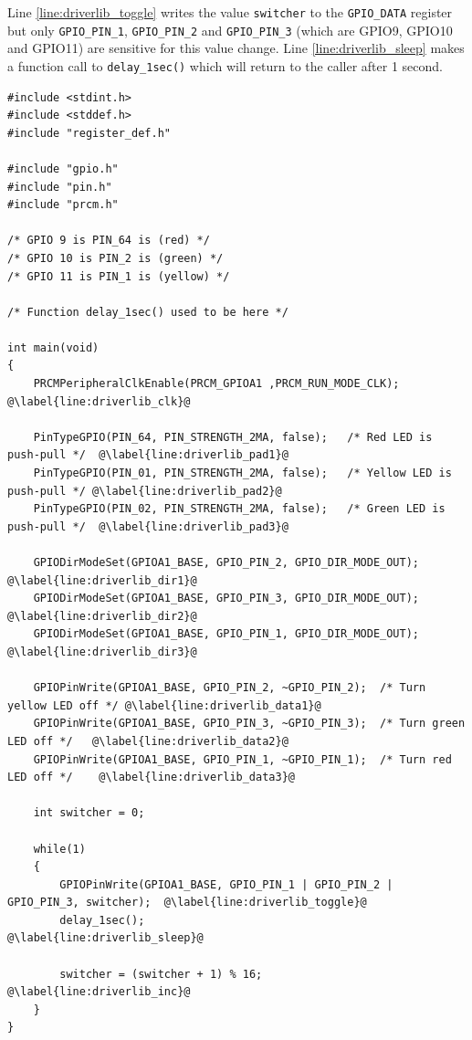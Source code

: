 Line \ref{line:driverlib_toggle} writes the value \texttt{switcher} to the \texttt{GPIO\_DATA} register but only \texttt{GPIO\_PIN\_1}, \texttt{GPIO\_PIN\_2} and \texttt{GPIO\_PIN\_3} (which are GPIO9, GPIO10 and GPIO11) are sensitive for this value change. 
Line \ref{line:driverlib_sleep} makes a function call to \texttt{delay\_1sec()} which will return to the caller after 1 second.

\begin{lstlisting}[style=CStyle, caption={Toggling LEDs according to Table \ref{tab:led_scheme} using Driverlib library}, captionpos=b, label={lst:led_driverlib}, escapechar=@]
#include <stdint.h>
#include <stddef.h>
#include "register_def.h"
 
#include "gpio.h"
#include "pin.h"
#include "prcm.h"
 
/* GPIO 9 is PIN_64 is (red) */
/* GPIO 10 is PIN_2 is (green) */
/* GPIO 11 is PIN_1 is (yellow) */
 
/* Function delay_1sec() used to be here */
 
int main(void)
{
    PRCMPeripheralClkEnable(PRCM_GPIOA1 ,PRCM_RUN_MODE_CLK);        @\label{line:driverlib_clk}@
 
    PinTypeGPIO(PIN_64, PIN_STRENGTH_2MA, false);   /* Red LED is push-pull */  @\label{line:driverlib_pad1}@
    PinTypeGPIO(PIN_01, PIN_STRENGTH_2MA, false);   /* Yellow LED is push-pull */ @\label{line:driverlib_pad2}@
    PinTypeGPIO(PIN_02, PIN_STRENGTH_2MA, false);   /* Green LED is push-pull */  @\label{line:driverlib_pad3}@
 
    GPIODirModeSet(GPIOA1_BASE, GPIO_PIN_2, GPIO_DIR_MODE_OUT); @\label{line:driverlib_dir1}@
    GPIODirModeSet(GPIOA1_BASE, GPIO_PIN_3, GPIO_DIR_MODE_OUT); @\label{line:driverlib_dir2}@
    GPIODirModeSet(GPIOA1_BASE, GPIO_PIN_1, GPIO_DIR_MODE_OUT); @\label{line:driverlib_dir3}@
 
    GPIOPinWrite(GPIOA1_BASE, GPIO_PIN_2, ~GPIO_PIN_2);  /* Turn yellow LED off */ @\label{line:driverlib_data1}@
    GPIOPinWrite(GPIOA1_BASE, GPIO_PIN_3, ~GPIO_PIN_3);  /* Turn green LED off */   @\label{line:driverlib_data2}@
    GPIOPinWrite(GPIOA1_BASE, GPIO_PIN_1, ~GPIO_PIN_1);  /* Turn red LED off */    @\label{line:driverlib_data3}@
 
    int switcher = 0;
 
    while(1)
    {
        GPIOPinWrite(GPIOA1_BASE, GPIO_PIN_1 | GPIO_PIN_2 | GPIO_PIN_3, switcher);  @\label{line:driverlib_toggle}@
        delay_1sec();                                                               @\label{line:driverlib_sleep}@
 
        switcher = (switcher + 1) % 16;                                             @\label{line:driverlib_inc}@
    }
}
\end{lstlisting}

